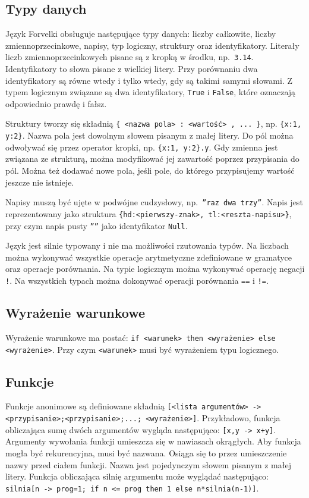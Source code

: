 \documentclass[4paper,10pt]{article}
\begin{document}
\subsection{Typy danych}
Język Forvelki obsługuje następujące typy danych: liczby całkowite, liczby zmiennoprzecinkowe, napisy, typ logiczny, struktury oraz identyfikatory.
Literały liczb zmiennoprzecinkowych pisane są z kropką w środku, np.~\texttt{3.14}.
Identyfikatory to słowa pisane z wielkiej litery.
Przy porównaniu dwa identyfikatory są równe wtedy i tylko wtedy, gdy są takimi samymi słowami.
Z typem logicznym związane są dwa identyfikatory, \texttt{True} i \texttt{False}, które oznaczają odpowiednio prawdę i fałsz.

Struktury tworzy się składnią \texttt{\{ <nazwa pola> : <wartość> , ... \}}, np. \texttt{\{x:1, y:2\}}.
Nazwa pola jest dowolnym słowem pisanym z małej litery.
Do pól można odwoływać się przez operator kropki, np. \texttt{\{x:1,~y:2\}.y}.
Gdy zmienna jest związana ze strukturą, można modyfikować jej zawartość poprzez przypisania do pól.
Można też dodawać nowe pola, jeśli pole, do którego przypisujemy wartość jeszcze nie istnieje.

Napisy muszą być ujęte w podwójne cudzysłowy, np.~\texttt{''raz dwa trzy''}.
Napis jest reprezentowany jako struktura \texttt{\{hd:<pierwszy-znak>,~tl:<reszta-napisu>\}}, przy czym napis pusty \texttt{''''} jako identyfikator \texttt{Null}.

Język jest silnie typowany i nie ma możliwości rzutowania typów.
Na liczbach można wykonywać wszystkie operacje arytmetyczne zdefiniowane w gramatyce oraz operacje porównania.
Na typie logicznym można wykonywać operację negacji \texttt{!}.
Na wszystkich typach można dokonywać operacji porównania \texttt{==} i \texttt{!=}.

\subsection{Wyrażenie warunkowe}
Wyrażenie warunkowe ma postać:
\texttt{if <warunek> then <wyrażenie> else <wyrażenie>}.
Przy czym \texttt{<warunek>} musi być wyrażeniem typu logicznego.

\subsection{Funkcje}
Funkcje anonimowe są definiowane składnią \texttt{[<lista argumentów> -> <przypisanie>;<przypisanie>;...; <wyrażenie>]}.
Przykładowo, funkcja obliczająca sumę dwóch argumentów wygląda następująco: \texttt{[x,y~->~x+y]}.
Argumenty wywołania funkcji umieszcza się w nawiasach okrągłych.
Aby funkcja mogła być rekurencyjna, musi być nazwana.
Osiąga się to przez umieszczenie nazwy przed ciałem funkcji.
Nazwa jest pojedynczym słowem pisanym z małej litery.
Funkcja obliczająca silnię argumentu może wyglądać następująco: \texttt{silnia[n -> prog=1; if n <= prog then 1 else n*silnia(n-1)]}.
\end{document}
